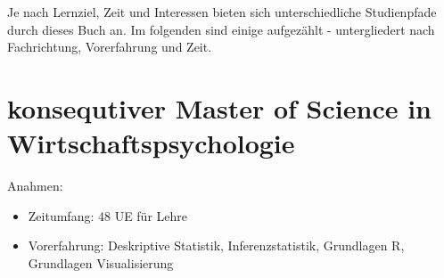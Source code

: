 \documentclass[12pt,]{book}
\begin{document}
Je nach Lernziel, Zeit und Interessen bieten sich unterschiedliche
Studienpfade durch dieses Buch an. Im folgenden sind einige aufgezählt -
untergliedert nach Fachrichtung, Vorerfahrung und Zeit.

\section{konsequtiver Master of Science in
Wirtschaftspsychologie}\label{konsequtiver-master-of-science-in-wirtschaftspsychologie}

Anahmen:

\begin{itemize}
\item
  Zeitumfang: 48 UE für Lehre
\item
  Vorerfahrung: Deskriptive Statistik, Inferenzstatistik, Grundlagen R,
  Grundlagen Visualisierung
\end{itemize}
\end{document}
